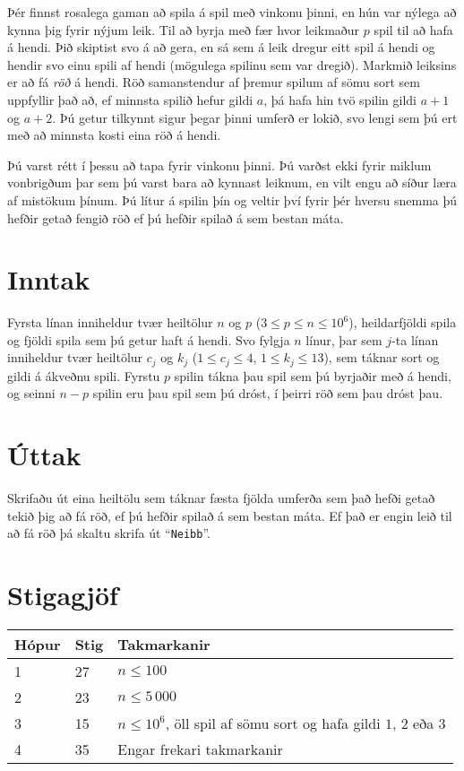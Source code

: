 %
Þér finnst rosalega gaman að spila á spil með vinkonu þinni, en hún var nýlega
að kynna þig fyrir nýjum leik. Til að byrja með fær hvor leikmaður $p$ spil til
að hafa á hendi. Þið skiptist svo á að gera, en sá sem á leik dregur eitt spil
á hendi og hendir svo einu spili af hendi (mögulega spilinu sem var dregið).
Markmið leiksins er að fá \emph{röð} á hendi. Röð samanstendur af þremur spilum
af sömu sort sem uppfyllir það að, ef minnsta spilið hefur gildi $a$, þá hafa
hin tvö spilin gildi $a+1$ og $a+2$. Þú getur tilkynnt sigur þegar þinni umferð
er lokið, svo lengi sem þú ert með að minnsta kosti eina röð á hendi.

Þú varst rétt í þessu að tapa fyrir vinkonu þinni. Þú varðst ekki fyrir miklum
vonbrigðum þar sem þú varst bara að kynnast leiknum, en vilt engu að síður læra
af mistökum þínum. Þú lítur á spilin þín og veltir því fyrir þér hversu snemma
þú hefðir getað fengið röð ef þú hefðir spilað á sem bestan máta.

\section*{Inntak}
Fyrsta línan inniheldur tvær heiltölur $n$ og $p$ ($3 \leq p \leq n \leq
10^6$), heildarfjöldi spila og fjöldi spila sem þú getur haft á hendi.
Svo fylgja $n$ línur, þar sem $j$-ta línan inniheldur tvær heiltölur $c_j$ og
$k_j$ ($1 \leq c_j \leq 4$, $1 \leq k_j \leq 13$), sem táknar sort og gildi á
ákveðnu spili. Fyrstu $p$ spilin tákna þau spil sem þú byrjaðir með á hendi, og
seinni $n-p$ spilin eru þau spil sem þú dróst, í þeirri röð sem þau dróst þau.

\section*{Úttak}
Skrifaðu út eina heiltölu sem táknar fæsta fjölda umferða sem það hefði getað
tekið þig að fá röð, ef þú hefðir spilað á sem bestan máta. Ef það er engin
leið til að fá röð þá skaltu skrifa út ``\texttt{Neibb}''.

\section*{Stigagjöf}
\begin{tabular}{|l|l|l|}
\hline
Hópur & Stig & Takmarkanir \\ \hline
1     & 27   & $n \leq 100$ \\ \hline
2     & 23   & $n \leq 5\,000$ \\ \hline
3     & 15   & $n \leq 10^6$, öll spil af sömu sort og hafa gildi $1$, $2$ eða $3$ \\ \hline
4     & 35   & Engar frekari takmarkanir\\ \hline
\end{tabular}

